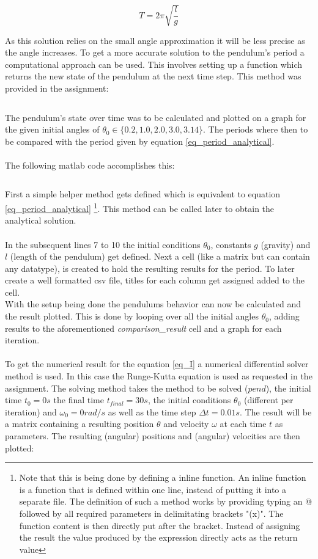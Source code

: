 \documentclass[14pt]{article}
\begin{document}
\begin{equation}\label{eq_period_analytical}
  T = 2 \pi \sqrt{\frac{l}{g}}
\end{equation}

As this solution relies on the small angle approximation it will be less precise as the angle increases.
To get a more accurate solution to the pendulum's period a computational approach can be used. This involves
setting up a function which returns the new state of the pendulum at the next time step. This method was provided in the assignment:
\inputminted[linenos]{octave}{./matlab/make_pend.m}

The pendulum's state over time was to be calculated and plotted on a graph for the given initial angles of 
$ \theta_0 \in \{0.2, 1.0, 2.0, 3.0, 3.14\} $. The periods where then to be compared with the period given by equation \ref{eq_period_analytical}.\\
\\
The following matlab code accomplishes this:

\inputminted[linenos]{octave}{./matlab/assignment_1.m}

First a simple helper method gets defined which is equivalent to equation \ref{eq_period_analytical} \footnote{Note that this is being done by defining a inline function.
An inline function is a function that is defined within one line, instead of putting it into a separate file. The definition of such a method works by providing
typing an @ followed by all required parameters in delimitating brackets "(x)". The function content is then directly put after the bracket. Instead of assigning
the result the value produced by the expression directly acts as the return value}. This method can be called later to obtain the analytical solution.\\
\\
In the subsequent lines 7 to 10 the initial conditions
$\theta_0$, constants $g$ (gravity) and $l$ (length of the pendulum) get defined. Next a cell (like a matrix but can contain any datatype),
is created to hold the resulting results for the period. To later create a well formatted csv file, titles for each column
get assigned added to the cell.\\
With the setup being done the pendulums behavior can now be calculated and the result plotted.
This is done by looping over all the initial
angles $\theta_0$, adding results to the aforementioned \textit{comparison\_result} cell and a graph for each iteration.\\
\\
To get the numerical result for the equation \ref{eq_I} a numerical differential solver method is used. In this
case the Runge-Kutta equation is used as requested in the assignment. The solving method takes the method to be solved ($pend$), the
initial time $t_0 = 0s$ the final time $t_{final} = 30s$, the initial conditions $\theta_0$ (different per iteration) and $\omega_0 = 0rad/s$ as well
as the time step $\Delta t = 0.01s$. The result will be a matrix containing a resulting position $\theta$ and
velocity $\omega$ at each time $t$ as parameters. The resulting (angular) positions and (angular) velocities are then plotted:
\end{document}
